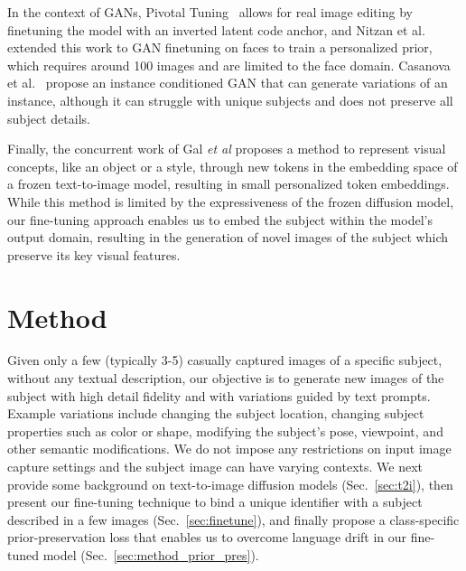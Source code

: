 In the context of GANs, Pivotal Tuning~\cite{roich2021pivotal} allows for real image editing by finetuning the model with an inverted latent code anchor, and Nitzan et al.~\cite{nitzan2022mystyle} extended this work to GAN finetuning on faces to train a personalized prior, which requires around 100 images and are limited to the face domain. Casanova et al.~\cite{casanova2021instance} propose an instance conditioned GAN that can generate variations of an instance, although it can struggle with unique subjects and does not preserve all subject details. 

Finally, the concurrent work of Gal \emph{et al}\onedot\cite{gal2022image} proposes a method to represent visual concepts, like an object or a style, through new tokens in the embedding space of a frozen text-to-image model, resulting in small personalized token embeddings. While this method is limited by the expressiveness of the frozen diffusion model, our fine-tuning approach enables us to embed the subject within the model's output domain, resulting in the generation of novel images of the subject which preserve its key visual features.

\section{Method}
\label{sec:method}

Given only a few (typically 3-5) casually captured images of a specific subject, without any textual description, our objective is to generate new images of the subject with high detail fidelity and with variations guided by text prompts. Example variations include changing the subject location, changing subject properties such as color or shape, modifying the subject's pose, viewpoint, and other semantic modifications. We do not impose any restrictions on input image capture settings and the subject image can have varying contexts. We next provide some background on text-to-image diffusion models (Sec.~\ref{sec:t2i}), then present our fine-tuning technique to bind a unique identifier with a subject described in a few images (Sec.~\ref{sec:finetune}), and finally propose a class-specific prior-preservation loss that enables us to overcome language drift in our fine-tuned model (Sec.~\ref{sec:method_prior_pres}).

